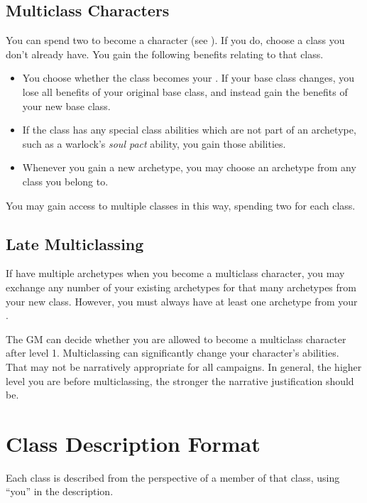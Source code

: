         \subsection{Multiclass Characters}\label{Multiclass Characters}
            You can spend two  to become a  character (see ).
            If you do, choose a class you don't already have.
            You gain the following benefits relating to that class.
            \begin{itemize}
                \item You choose whether the class becomes your .
                    If your base class changes, you lose all benefits of your original base class, and instead gain the benefits of your new base class.
                \item If the class has any special class abilities which are not part of an archetype, such as a warlock's \textit{soul pact} ability, you gain those abilities.
                \item Whenever you gain a new archetype, you may choose an archetype from any class you belong to.
            \end{itemize}

            You may gain access to multiple classes in this way, spending two  for each class.

            \subsection{Late Multiclassing}
                If have multiple archetypes when you become a multiclass character, you may exchange any number of your existing archetypes for that many archetypes from your new class.
                However, you must always have at least one archetype from your .

                The GM can decide whether you are allowed to become a multiclass character after level 1.
                Multiclassing can significantly change your character's abilities.
                That may not be narratively appropriate for all campaigns.
                In general, the higher level you are before multiclassing, the stronger the narrative justification should be.

\section{Class Description Format}
    Each class is described from the perspective of a member of that class, using ``you'' in the description.

